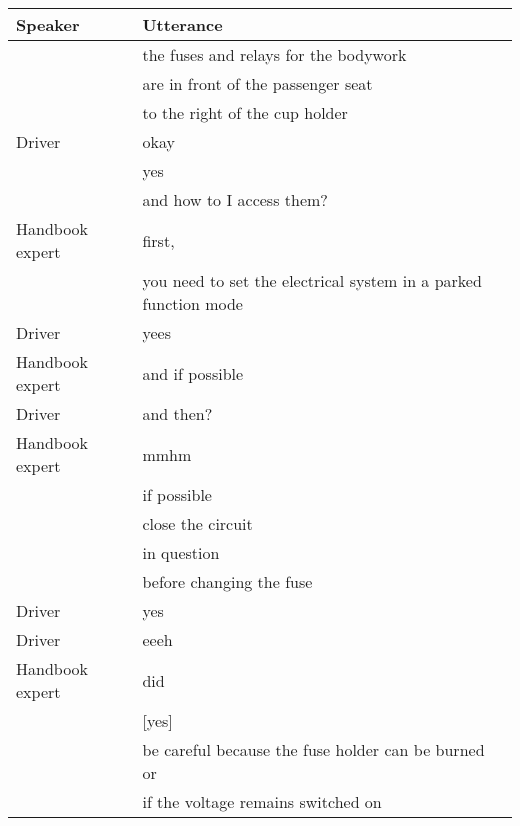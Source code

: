 \begin{table}[H]
\begin{tabular}{p{3cm}p{8cm}}
Speaker & Utterance \\
\hline

                    & the fuses and relays for the bodywork                           \\
                    & are in front of the passenger seat                              \\
                    & to the right of the cup holder                                  \\
Driver              & okay                                                            \\
                    & yes                                                             \\
                    & and how to I access them?                                       \\
Handbook expert & first,                                                          \\
                    & you need to set the electrical system in a parked function mode \\
Driver              & yees                                                            \\
Handbook expert & and if possible                                                 \\
Driver              & and then?                                                       \\
Handbook expert & mmhm                                                            \\
                    & if possible                                                     \\
                    & close the circuit                                               \\
                    & in question                                                     \\
                    & before changing the fuse                                        \\
Driver              & yes                                                             \\
Driver              & eeeh                                                            \\
Handbook expert & did                                                             \\
                    & {[}yes{]}                                                       \\
                    & be careful because the fuse holder can be burned or             \\
                    & if the voltage remains switched on                             
\end{tabular}
\end{table}